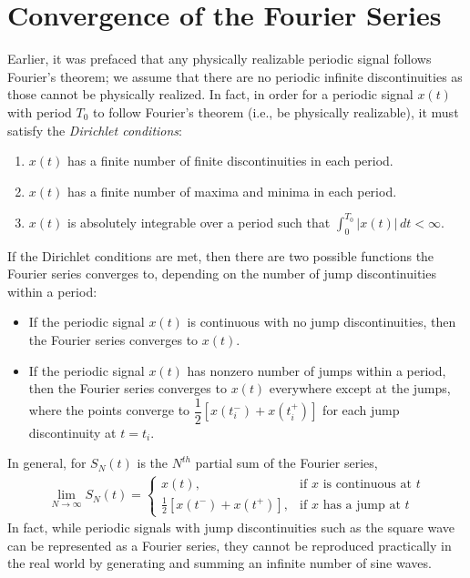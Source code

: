 \documentclass{report}
\begin{document}
\section{Convergence of the Fourier Series}
Earlier, it was prefaced that any physically realizable periodic signal follows Fourier's theorem; we assume that there are no periodic infinite discontinuities 
as those cannot be physically realized. In fact, in order for a periodic signal $x(t)$ with period $T_0$ to follow Fourier's theorem (i.e., be physically realizable), 
it must satisfy the \emph{Dirichlet conditions}:
\begin{enumerate}
    \item $x(t)$ has a finite number of finite discontinuities in each period.
    \item $x(t)$ has a finite number of maxima and minima in each period.
    \item $x(t)$ is absolutely integrable over a period such that $\displaystyle\int_{0}^{T_0}|x(t)| \,dt < \infty$.
\end{enumerate}
If the Dirichlet conditions are met, then there are two possible functions the Fourier series converges to, depending on the number of jump discontinuities within a period:
\begin{itemize}
    \item If the periodic signal $x(t)$ is continuous with no jump discontinuities, then the Fourier series converges to $x(t)$.
    \item If the periodic signal $x(t)$ has nonzero number of jumps within a period, then the Fourier series converges to $x(t)$ everywhere except at the jumps, where 
    the points converge to $\dfrac{1}{2}[x(t_i^-)+x(t_i^+)]$ for each jump discontinuity at $t=t_i$.
\end{itemize}
In general, for $S_N(t)$ is the $N^{th}$ partial sum of the Fourier series, 
\begin{align}
    \lim_{N\rightarrow\infty} S_N(t) = 
    \begin{cases}
        x(t), & \text{if $x$ is continuous at $t$} \\
        \frac{1}{2}[x(t^-)+x(t^+)], & \text{if $x$ has a jump at $t$}
    \end{cases}
\end{align}
In fact, while periodic signals with jump discontinuities such as the square wave can be represented as a Fourier series, they cannot be reproduced practically in the real world by generating and summing 
an infinite number of sine waves. 
\\ \\
\end{document}
